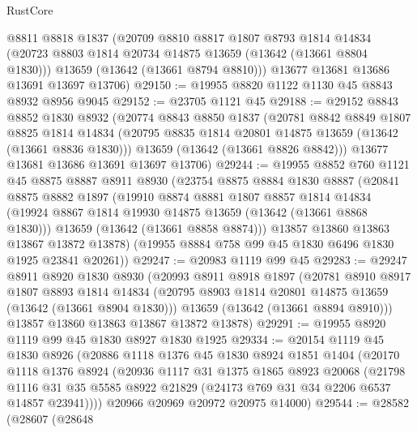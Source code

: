 \begin{lexlean}{RustCore}
\begin{coremodule}
      @8811
      @8818
      @1837
      (@20709
        @8810
        @8817
        @1807
        @8793
        @1814
        @14834
        (@20723 @8803 @1814 @20734 @14875 @13659 (@13642 (@13661 @8804 @1830)))
        @13659
        (@13642 (@13661 @8794 @8810)))
      @13677
      @13681
      @13686
      @13691
      @13697
      @13706)
@29150 := @19955 @8820 @1122 @1130 @45 @8843 @8932 @8956 @9045
@29152 := @23705 @1121 @45
@29188 := @29152
    @8843
    @8852
    @1830
    @8932
    (@20774
      @8843
      @8850
      @1837
      (@20781
        @8842
        @8849
        @1807
        @8825
        @1814
        @14834
        (@20795 @8835 @1814 @20801 @14875 @13659 (@13642 (@13661 @8836 @1830)))
        @13659
        (@13642 (@13661 @8826 @8842)))
      @13677
      @13681
      @13686
      @13691
      @13697
      @13706)
@29244 := @19955
    @8852
    @760
    @1121
    @45
    @8875
    @8887
    @8911
    @8930
    (@23754
      @8875
      @8884
      @1830
      @8887
      (@20841
        @8875
        @8882
        @1897
        (@19910
          @8874
          @8881
          @1807
          @8857
          @1814
          @14834
          (@19924 @8867 @1814 @19930 @14875 @13659 (@13642 (@13661 @8868 @1830)))
          @13659
          (@13642 (@13661 @8858 @8874)))
        @13857
        @13860
        @13863
        @13867
        @13872
        @13878)
      (@19955 @8884 @758 @99 @45 @1830 @6496 @1830 @1925 @23841 @20261))
@29247 := @20983 @1119 @99 @45
@29283 := @29247
    @8911
    @8920
    @1830
    @8930
    (@20993
      @8911
      @8918
      @1897
      (@20781
        @8910
        @8917
        @1807
        @8893
        @1814
        @14834
        (@20795 @8903 @1814 @20801 @14875 @13659 (@13642 (@13661 @8904 @1830)))
        @13659
        (@13642 (@13661 @8894 @8910)))
      @13857
      @13860
      @13863
      @13867
      @13872
      @13878)
@29291 := @19955 @8920 @1119 @99 @45 @1830 @8927 @1830 @1925
@29334 := @20154
    @1119
    @45
    @1830
    @8926
    (@20886
      @1118
      @1376
      @45
      @1830
      @8924
      @1851
      @1404
      (@20170
        @1118
        @1376
        @8924
        (@20936
          @1117
          @31
          @1375
          @1865
          @8923
          @20068
          (@21798
            @1116
            @31
            @35
            @5585
            @8922
            @21829
            (@24173 @769 @31 @34 @2206 @6537 @14857 @23941))))
      @20966
      @20969
      @20972
      @20975
      @14000)
@29544 := @28582
    (@28607
      (@28648

\end{coremodule}
\end{lexlean}
